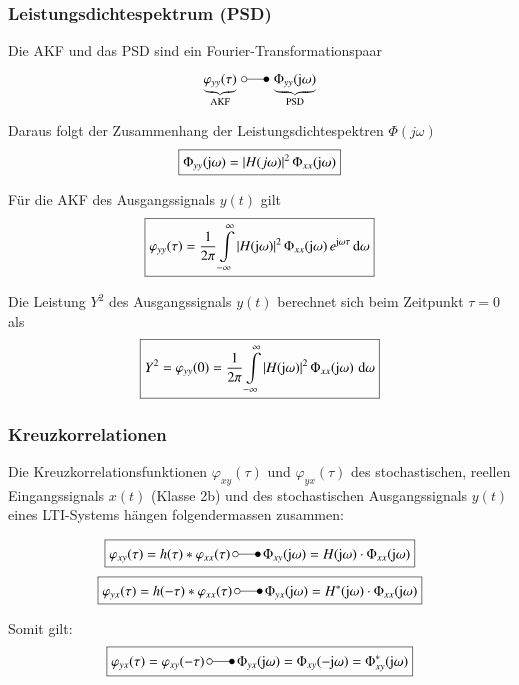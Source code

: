 \subsubsection{Leistungsdichtespektrum (PSD)}

Die AKF und das PSD sind ein Fourier-Transformationspaar
$$ \underbrace{\varphi_{yy}(\tau)}_{\text{AKF}} \, \laplace \, \underbrace{\Phi_{yy}(\jimg  \omega)}_{\text{PSD}} $$

Daraus folgt der Zusammenhang der Leistungsdichtespektren $\Phi(j \omega)$
$$ \boxed{ \Phi_{yy}(\mathrm{j}  \omega) = |H(j \omega)|^2 \, \Phi_{xx}(\mathrm{j}  \omega) } $$

Für die AKF des Ausgangssignals $y(t)$ gilt 
$$ \boxed{ \varphi_{yy}(\tau) = \frac{1}{2 \pi} \int\limits_{- \infty}^{\infty} |H(\mathrm{j}  \omega)|^2 \, \Phi_{xx}(\mathrm{j}  \omega) \, e^{\mathrm{j}  \omega \tau} \mathop{} \! \mathrm{d} \omega } $$

Die Leistung $Y^2$ des Ausgangssignals $y(t)$ berechnet sich beim Zeitpunkt $\tau = 0$ als
$$ \boxed{ Y^2 = \varphi_{yy}(0) = \frac{1}{2 \pi} \int\limits_{- \infty}^{\infty} |H(\mathrm{j}  \omega)|^2 \, \Phi_{xx}(\mathrm{j}  \omega) \, \mathop{} \! \mathrm{d} \omega } $$


\subsubsection{Kreuzkorrelationen}

Die Kreuzkorrelationsfunktionen $\varphi_{xy}(\tau)$ und $\varphi_{yx}(\tau)$ des stochastischen, reellen Eingangssignals $x(t)$ 
(Klasse 2b) und des stochastischen Ausgangssignals $y(t)$ eines LTI-Systems hängen folgendermassen zusammen:

$$ \boxed{ \varphi_{xy}(\tau) = h(\tau) * \varphi_{xx}(\tau) \, \laplace \, \Phi_{xy}(\jimg  \omega) = H(\jimg  \omega) \cdot \Phi_{xx}(\jimg  \omega) } $$
$$ \boxed{ \varphi_{yx}(\tau) = h(-\tau) * \varphi_{xx}(\tau) \, \laplace \, \Phi_{yx}(\jimg  \omega) = H^*(\jimg  \omega) \cdot \Phi_{xx}(\jimg  \omega) } $$

Somit gilt:
$$ \boxed{ \varphi_{yx}(\tau) = \varphi_{xy}(-\tau) \, \laplace \, \Phi_{yx}(\jimg  \omega) = \Phi_{xy}(-\jimg  \omega) = \Phi^*_{xy}(\jimg  \omega) } $$